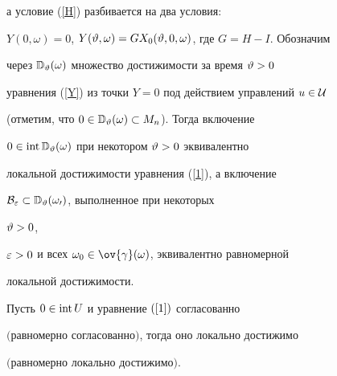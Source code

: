 а условие (\ref{H}) разбивается на два условия:


$Y(0,\omega)=0$, $Y(\vartheta,\omega)=GX_0(\vartheta,0,\omega)$, где $G=H-I$. Обозначим


через $\Bbb D_{\vartheta}(\omega)$ множество достижимости за время $\vartheta>0$


уравнения (\ref{Y}) из точки $Y=0$ под действием управлений $u\in\cal U$


(отметим, что $0\in\Bbb D_{\vartheta}(\omega)\subset M_n$). Тогда включение


$0\in\operatorname{int}\Bbb D_{\vartheta}(\omega)$ при некотором $\vartheta>0$ эквивалентно


локальной достижимости уравнения (\ref{1}), а включение


$\cal B_{\varepsilon}\subset\Bbb D_{\vartheta}(\omega_0)$, выполненное при некоторых


$\vartheta>0$,


$\varepsilon>0$ и всех $\omega_0\in\ov{\gamma}(\omega)$, эквивалентно равномерной


локальной достижимости.





\begin{thm}


\label{th2}


Пусть $0\in\operatorname{int} U$ и уравнение $(\ref{1})$ согласованно


$($равномерно согласованно$)$, тогда оно локально достижимо


$($равномерно локально достижимо$)$.


\end{thm}





